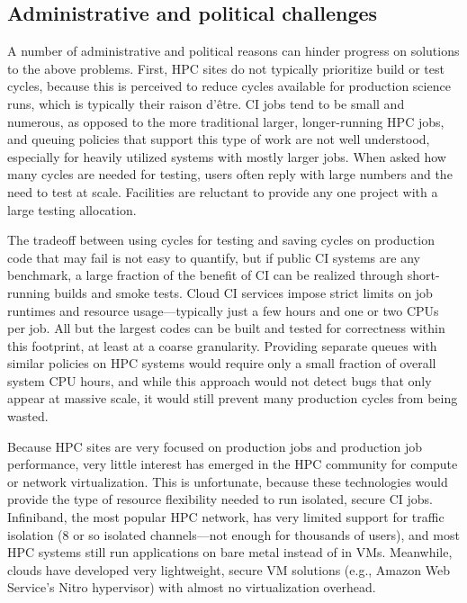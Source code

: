\documentclass{IEEEcsmag}
\begin{document}
\subsection{Administrative and political challenges}

A number of administrative and political reasons can hinder 
progress on solutions to the above problems.
First, HPC sites do not typically prioritize build
or test cycles, because this is perceived to reduce cycles available
for production science runs, which is typically their raison d'\^etre. CI jobs tend
to be small and numerous, as opposed to the
more traditional larger, longer-running HPC jobs, and queuing policies that support this type of
work are not well understood, especially for heavily utilized systems with mostly larger jobs.
When asked how many cycles are needed for testing, users often reply with large numbers and
the need to test at scale. Facilities are reluctant to provide any one project
with a large testing allocation.

The tradeoff between using cycles for testing and saving cycles on production code that
may fail is not easy to quantify, but if public CI systems are any benchmark, a large
fraction of the benefit of CI can be realized through short-running builds and smoke
tests. Cloud CI services impose strict limits on job runtimes and resource
usage---typically just a few hours and one or two CPUs per job. All but the
largest codes can be built and tested for correctness within this footprint, at least at
a coarse granularity. Providing separate queues with similar policies on HPC systems
would require only a small fraction of overall system CPU hours, and while this approach
would not detect bugs that only appear at massive scale, it would still prevent many
production cycles from being wasted.

Because HPC sites are very focused on production jobs and production job performance,
very little interest has emerged in the HPC community for compute or network
virtualization. This is unfortunate, because these technologies would provide the type
of resource flexibility needed to run isolated, secure CI jobs. Infiniband, the most
popular HPC network, has very limited support for traffic isolation (8 or so isolated
channels---not enough for thousands of users), and most HPC systems still run
applications on bare metal instead of in VMs. Meanwhile, clouds have developed very
lightweight, secure VM solutions (e.g., Amazon Web Service's Nitro hypervisor) with
almost no virtualization overhead.
\end{document}
